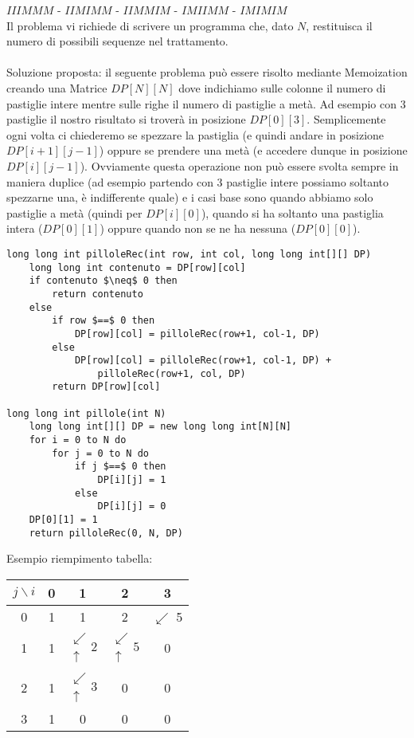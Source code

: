 \documentclass[../cheatSheetAlgoritmi.tex]{subfiles}
\begin{document}
$IIIMMM$ - $IIMIMM$ - $IIMMIM$ - $IMIIMM$ - $IMIMIM$\\
Il problema vi richiede di scrivere un programma che, dato $N$, restituisca il numero di possibili sequenze nel trattamento.\\\\
Soluzione proposta: il seguente problema può essere risolto mediante Memoization creando una Matrice $DP[N][N]$ dove indichiamo sulle colonne il numero di pastiglie intere mentre sulle righe il numero di pastiglie a metà. Ad esempio con 3 pastiglie il nostro risultato si troverà in posizione $DP[0][3]$. Semplicemente ogni volta ci chiederemo se spezzare la pastiglia (e quindi andare in posizione $DP[i+1][j-1]$) oppure se prendere una metà (e accedere dunque in posizione $DP[i][j-1]$). Ovviamente questa operazione non può essere svolta sempre in maniera duplice (ad esempio partendo con 3 pastiglie intere possiamo soltanto spezzarne una, è indifferente quale) e i casi base sono quando abbiamo solo pastiglie a metà (quindi per $DP[i][0]$), quando si ha soltanto una pastiglia intera ($DP[0][1]$) oppure quando non se ne ha nessuna ($DP[0][0]$).
\begin{lstlisting}[caption=Le pillole della Zia]
long long int pilloleRec(int row, int col, long long int[][] DP)
	long long int contenuto = DP[row][col]
	if contenuto $\neq$ 0 then
		return contenuto
	else
		if row $==$ 0 then
			DP[row][col] = pilloleRec(row+1, col-1, DP)
		else
			DP[row][col] = pilloleRec(row+1, col-1, DP) + 
				pilloleRec(row+1, col, DP)
		return DP[row][col]

long long int pillole(int N)
	long long int[][] DP = new long long int[N][N]
	for i = 0 to N do
		for j = 0 to N do
			if j $==$ 0 then
				DP[i][j] = 1
			else
				DP[i][j] = 0
	DP[0][1] = 1
	return pilloleRec(0, N, DP)
\end{lstlisting}
Esempio riempimento tabella:\\
\begin{center}
	\renewcommand{\arraystretch}{1.2}
	\begin{tabular}{ |c|c|c|c|c| } 
		\hline
			$j \backslash i$ &0 &1 &2 &3\\
		\hline
			0 &1 &1 &2 &$\swarrow$ 5\\
		\hline
			1 &1 & $\substack{\swarrow\\[-1em] \uparrow} 2$ & $\substack{\swarrow\\[-1em] \uparrow} 5$&0 \\
		\hline
			2 &1 & $\substack{\swarrow\\[-1em] \uparrow} 3$ &0 &0\\
		\hline
			3 &1 &0 &0 &0\\
		\hline
	\end{tabular}
\end{center}
\newpage
\end{document}
